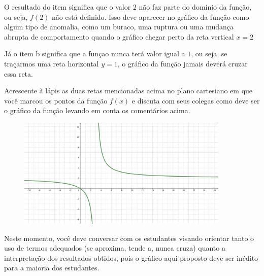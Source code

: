 \documentclass[main.tex]{subfiles}
\begin{document}
O resultado do item significa que o valor $2$ não faz parte do domínio da função, ou seja, $f(2)$ não está definido. Isso deve aparecer no gráfico da função como algum tipo de anomalia, como um buraco, uma ruptura ou uma mudança abrupta de comportamento quando o gráfico chegar perto da reta vertical $x=2$

Já o item b significa que a funçao nunca terá valor igual a $1$, ou seja, se traçarmos uma reta horizontal $y=1$, o gráfico da função jamais deverá cruzar essa reta.

\begin{questao}
Acrescente à lápis as duas retas mencionadas acima no plano cartesiano em que você marcou os pontos da função $f(x)$ e discuta com seus colegas como deve ser o gráfico da função levando em conta os comentários acima.
\end{questao}

\begin{gabarito}
	\begin{gabaritoQuestao}
	
		\begin{figure}[h]
        \centering
        \includegraphics[width=0.9\textwidth]{img/c3r13.png}
        \end{figure}
        
	\end{gabaritoQuestao}
\end{gabarito}

\paraTutores

Neste momento, você deve conversar com os estudantes visando orientar tanto o uso de termos adequados (se aproxima, tende a, nunca cruza) quanto a interpretação dos resultados obtidos, pois o gráfico aqui proposto deve ser inédito para a maioria dos estudantes.

\paraAmbos
\newpage
\end{document}
